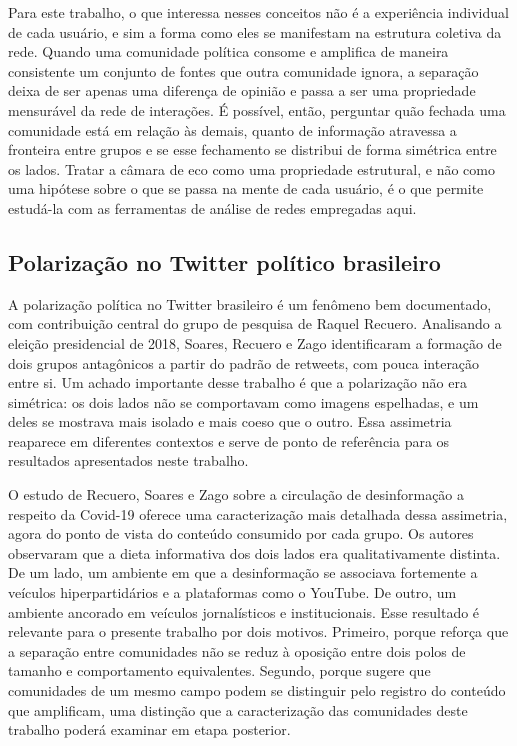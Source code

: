 \documentclass[conference]{IEEEtran}
\begin{document}
Para este trabalho, o que interessa nesses conceitos não é a experiência individual de cada usuário, e sim a forma como eles se manifestam na estrutura coletiva da rede. Quando uma comunidade política consome e amplifica de maneira consistente um conjunto de fontes que outra comunidade ignora, a separação deixa de ser apenas uma diferença de opinião e passa a ser uma propriedade mensurável da rede de interações. É possível, então, perguntar quão fechada uma comunidade está em relação às demais, quanto de informação atravessa a fronteira entre grupos e se esse fechamento se distribui de forma simétrica entre os lados. Tratar a câmara de eco como uma propriedade estrutural, e não como uma hipótese sobre o que se passa na mente de cada usuário, é o que permite estudá-la com as ferramentas de análise de redes empregadas aqui.

\subsection{Polarização no Twitter político brasileiro}
A polarização política no Twitter brasileiro é um fenômeno bem documentado, com contribuição central do grupo de pesquisa de Raquel Recuero. Analisando a eleição presidencial de 2018, Soares, Recuero e Zago \cite{b_soares2019} identificaram a formação de dois grupos antagônicos a partir do padrão de retweets, com pouca interação entre si. Um achado importante desse trabalho é que a polarização não era simétrica: os dois lados não se comportavam como imagens espelhadas, e um deles se mostrava mais isolado e mais coeso que o outro. Essa assimetria reaparece em diferentes contextos e serve de ponto de referência para os resultados apresentados neste trabalho.

O estudo de Recuero, Soares e Zago \cite{b_recuero2021} sobre a circulação de desinformação a respeito da Covid-19 oferece uma caracterização mais detalhada dessa assimetria, agora do ponto de vista do conteúdo consumido por cada grupo. Os autores observaram que a dieta informativa dos dois lados era qualitativamente distinta. De um lado, um ambiente em que a desinformação se associava fortemente a veículos hiperpartidários e a plataformas como o YouTube. De outro, um ambiente ancorado em veículos jornalísticos e institucionais. Esse resultado é relevante para o presente trabalho por dois motivos. Primeiro, porque reforça que a separação entre comunidades não se reduz à oposição entre dois polos de tamanho e comportamento equivalentes. Segundo, porque sugere que comunidades de um mesmo campo podem se distinguir pelo registro do conteúdo que amplificam, uma distinção que a caracterização das comunidades deste trabalho poderá examinar em etapa posterior.
\end{document}
